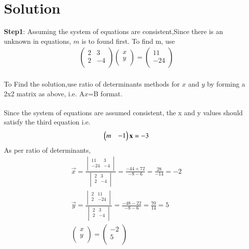 \documentclass[journal,12pt,twocolumn]{IEEEtran}
\begin{document}
\section{Solution}
\textbf{Step1}: Assuming the system of equations are consistent,Since there is an unknown in equations, $m$ is to found first. To find m, use\\
\begin{align*}
\begin{pmatrix}2 & 3\\2 & -4\\\end{pmatrix}
\begin{pmatrix}x\\y\\\end{pmatrix}=
\begin{pmatrix}11\\-24\\\end{pmatrix}
\end{align*}
\\To Find the solution,use ratio of determinants methods for $x$ and $y$ by forming a 2x2 matrix as above, i.e. A$x$=B format.\\
\\Since the system of equations are assumed consistent, the x and y values should satisfy the third equation i.e.
\begin{align*}
\begin{pmatrix}m & -1\end{pmatrix}\mathbf{x}&=-3\\
\end{align*}
As per ratio of determinants,\\
\begin{align*}
\vec{x}=\frac{\begin{vmatrix}11 & 3\\-24 & -4\\\end{vmatrix}}{\begin{vmatrix}2 & 3\\2 & -4\\\end{vmatrix}}=\frac{-44+72}{-8-6}=\frac{28}{-14}=-2\\
\vec{y}=\frac{\begin{vmatrix}2 & 11\\2 & -24\\\end{vmatrix}}{\begin{vmatrix}2 & 3\\2 & -4\\\end{vmatrix}}=\frac{-48-22}{-8-6}=\frac{70}{14}=5\\
\begin{pmatrix}x\\y\\\end{pmatrix}=\begin{pmatrix}-2\\5\\\end{pmatrix}
\end{align*}
\end{document}
